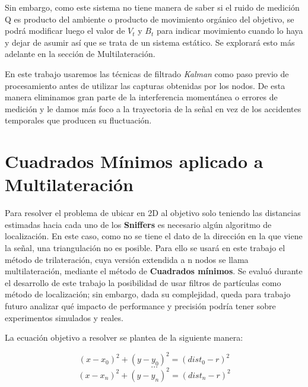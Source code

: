 


Sin embargo, como este sistema no tiene manera de saber si el ruido de medición Q es producto del ambiente o producto de movimiento orgánico del objetivo, se podrá modificar luego el valor de \(V_{t}\) y \(B_{t}\) para indicar movimiento cuando lo haya y dejar de asumir así que se trata de un sistema estático. Se explorará esto más adelante en la sección de Multilateración.

En este trabajo usaremos las técnicas de filtrado \textit{Kalman} como paso previo de procesamiento antes de utilizar las capturas obtenidas por los nodos. De esta manera eliminamos gran parte de la interferencia momentánea o errores de medición y le damos más foco a la trayectoria de la señal en vez de los accidentes temporales que producen su fluctuación.

\section{Cuadrados Mínimos aplicado a Multilateración}

\label{sec:lsq}

Para resolver el problema de ubicar en 2D al objetivo solo teniendo las distancias estimadas hacia cada uno de los \textbf{Sniffers} es necesario algún algoritmo de localización. En este caso, como no se tiene el dato de la dirección en la que viene la señal, una triangulación no es posible. Para ello se usará en este trabajo el método de trilateración, cuya versión extendida a n nodos se llama multilateración, mediante el método de \textbf{Cuadrados mínimos}. Se evaluó durante el desarrollo de este trabajo la posibilidad de usar filtros de partículas como método de localización; sin embargo, dada su complejidad, queda para trabajo futuro analizar qué impacto de performance y precisión podría tener sobre experimentos simulados y reales.

La ecuación objetivo a resolver se plantea de la siguiente manera:

\begin{equation}
(x - x_0)^2 + (y - y_0)^2 = (dist_0 - r )^2
\end{equation}
\begin{equation}
\ldots
\end{equation}
\begin{equation}
(x - x_n)^2 + (y - y_n)^2 = (dist_n - r )^2
\end{equation}

